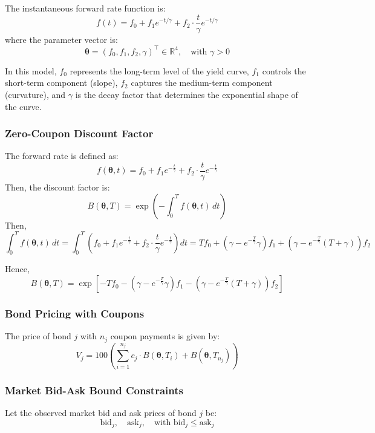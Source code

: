 \documentclass[12pt]{article}
\begin{document}
The instantaneous forward rate function is:
\[
f(t) = f_0 + f_1 e^{-t/\gamma} + f_2 \cdot \frac{t}{\gamma} e^{-t/\gamma}
\]
where the parameter vector is:
\[
\boldsymbol{\theta} = (f_0, f_1, f_2, \gamma)^\top \in \mathbb{R}^4, \quad \text{with } \gamma > 0
\]

In this model, \( f_0 \) represents the long-term level of the yield curve, \( f_1 \) controls the short-term component (slope), \( f_2 \) captures the medium-term component (curvature), and \( \gamma \) is the decay factor that determines the exponential shape of the curve.


\subsubsection{Zero-Coupon Discount Factor}

The forward rate is defined as:
\[
f(\boldsymbol{\theta}, t) = f_0 + f_1 e^{- \frac{t}{\gamma}} + f_2 \cdot \frac{t}{\gamma} e^{- \frac{t}{\gamma}}
\]
Then, the discount factor is:
\[
B(\boldsymbol{\theta}, T) = \exp\left( - \int_0^T f(\boldsymbol{\theta}, t) \, dt \right)
\]
Then,
\[
 \int_0^T f(\boldsymbol{\theta}, t) \, dt =
\int_0^T \left( f_0 + f_1 e^{- \frac{t}{\gamma}} + f_2 \cdot \frac{t}{\gamma} e^{- \frac{t}{\gamma}} \right) dt
= T f_0 + \left( \gamma - e^{- \frac{T}{\gamma}} \gamma \right) f_1 + \left( \gamma - e^{- \frac{T}{\gamma}} (T + \gamma) \right) f_2
\]

Hence,
\[
B(\boldsymbol{\theta}, T)= \exp\left[
- T f_0
- \left( \gamma - e^{- \frac{T}{\gamma}} \gamma \right) f_1
- \left( \gamma - e^{- \frac{T}{\gamma}} (T + \gamma) \right) f_2
\right]
\]

\subsubsection{Bond Pricing with Coupons}

The price of bond \( j \) with \( n_j \) coupon payments is given by:
\[
V_j = 100 \left( \sum_{i=1}^{n_j } c_j \cdot B(\boldsymbol{\theta}, T_{i}) +  B(\boldsymbol{\theta}, T_{n_j}) \right)
\]

\subsubsection{Market Bid-Ask Bound Constraints}

Let the observed market bid and ask prices of bond \( j \) be:
\[
\text{bid}_j, \quad \text{ask}_j, \quad \text{with } \text{bid}_j \le \text{ask}_j
\]
\end{document}
